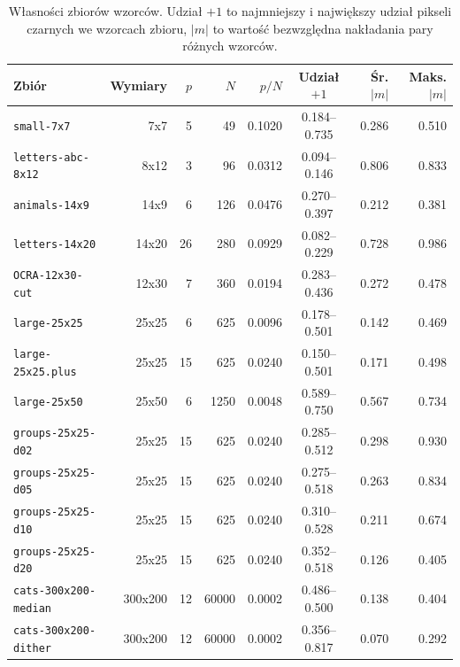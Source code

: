 \begin{table}[H]
    \centering
    \caption{Własności zbiorów wzorców. Udział $+1$ to najmniejszy i największy udział pikseli czarnych we wzorcach zbioru, $\lvert m \rvert$ to wartość bezwzględna nakładania pary różnych wzorców.}
    \label{tab:zbiory}
    \small
    \begin{tabular}{l r r r r c r r}
        \toprule
        Zbiór & Wymiary & $p$ & $N$ & $p/N$ & Udział $+1$ & Śr. $\lvert m \rvert$ & Maks. $\lvert m \rvert$ \\
        \midrule
        \texttt{small-7x7} & \mbox{7x7} & 5 & 49 & \num{0.1020} & \numrange{0.184}{0.735} & \num{0.286} & \num{0.510} \\
        \texttt{letters-abc-8x12} & \mbox{8x12} & 3 & 96 & \num{0.0312} & \numrange{0.094}{0.146} & \num{0.806} & \num{0.833} \\
        \texttt{animals-14x9} & \mbox{14x9} & 6 & 126 & \num{0.0476} & \numrange{0.270}{0.397} & \num{0.212} & \num{0.381} \\
        \texttt{letters-14x20} & \mbox{14x20} & 26 & 280 & \num{0.0929} & \numrange{0.082}{0.229} & \num{0.728} & \num{0.986} \\
        \texttt{OCRA-12x30-cut} & \mbox{12x30} & 7 & 360 & \num{0.0194} & \numrange{0.283}{0.436} & \num{0.272} & \num{0.478} \\
        \texttt{large-25x25} & \mbox{25x25} & 6 & 625 & \num{0.0096} & \numrange{0.178}{0.501} & \num{0.142} & \num{0.469} \\
        \texttt{large-25x25.plus} & \mbox{25x25} & 15 & 625 & \num{0.0240} & \numrange{0.150}{0.501} & \num{0.171} & \num{0.498} \\
        \texttt{large-25x50} & \mbox{25x50} & 6 & 1250 & \num{0.0048} & \numrange{0.589}{0.750} & \num{0.567} & \num{0.734} \\
        \midrule
        \texttt{groups-25x25-d02} & \mbox{25x25} & 15 & 625 & \num{0.0240} & \numrange{0.285}{0.512} & \num{0.298} & \num{0.930} \\
        \texttt{groups-25x25-d05} & \mbox{25x25} & 15 & 625 & \num{0.0240} & \numrange{0.275}{0.518} & \num{0.263} & \num{0.834} \\
        \texttt{groups-25x25-d10} & \mbox{25x25} & 15 & 625 & \num{0.0240} & \numrange{0.310}{0.528} & \num{0.211} & \num{0.674} \\
        \texttt{groups-25x25-d20} & \mbox{25x25} & 15 & 625 & \num{0.0240} & \numrange{0.352}{0.518} & \num{0.126} & \num{0.405} \\
        \midrule
        \texttt{cats-300x200-median} & \mbox{300x200} & 12 & \num{60000} & \num{0.0002} & \numrange{0.486}{0.500} & \num{0.138} & \num{0.404} \\
        \texttt{cats-300x200-dither} & \mbox{300x200} & 12 & \num{60000} & \num{0.0002} & \numrange{0.356}{0.817} & \num{0.070} & \num{0.292} \\
        \bottomrule
    \end{tabular}
\end{table}

